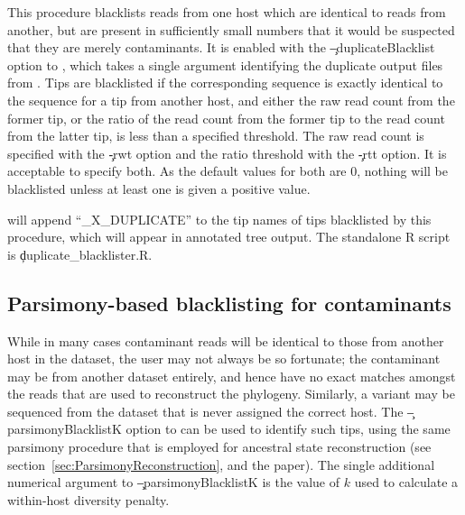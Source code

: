 This procedure blacklists reads from one host which are identical to reads from another, but are present in sufficiently small numbers that it would be suspected that they are merely contaminants.
It is enabled with the \c{--duplicateBlacklist} option to \pat, which takes a single argument identifying the duplicate output files from \pmt.
Tips are blacklisted if the corresponding sequence is exactly identical to the sequence for a tip from another host, and either the raw read count from the former tip, or the ratio of the read count from the former tip to the read count from the latter tip, is less than a specified threshold.
The raw read count is specified with the \c{-rwt} option and the ratio threshold with the \c{-rtt} option.
It is acceptable to specify both.
As the default values for both are 0, nothing will be blacklisted unless at least one is given a positive value.

\pat will append ``\_X\_DUPLICATE'' to the tip names of tips blacklisted by this procedure, which will appear in annotated tree output.
The standalone R script is \c{duplicate\_blacklister.R}.

\subsection{Parsimony-based blacklisting for contaminants}

While in many cases contaminant reads will be identical to those from another host in the dataset, the user may not always be so fortunate; the contaminant may be from another dataset entirely, and hence have no exact matches amongst the reads that are used to reconstruct the phylogeny.
Similarly, a variant may be sequenced from the dataset that is never assigned the correct host.
The \c{--parsimonyBlacklistK} option to \pat can be used to identify such tips, using the same parsimony procedure that is employed for ancestral state reconstruction (see section~\ref{sec:ParsimonyReconstruction}, and the \p paper).
The single additional numerical argument to \c{--parsimonyBlacklistK} is the value of $k$ used to calculate a within-host diversity penalty.

